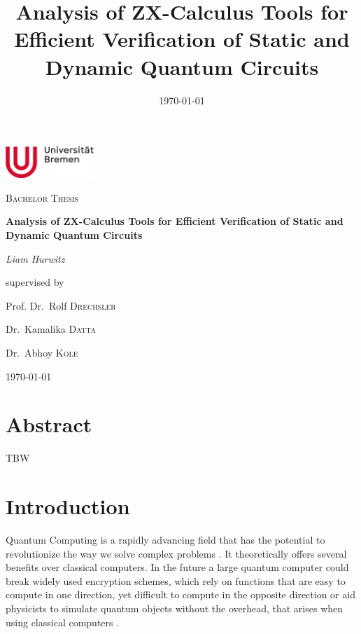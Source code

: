\documentclass[11pt]{article}
\date{\today}
\title{Analysis of ZX-Calculus Tools for Efficient Verification of Static and Dynamic Quantum Circuits}
\theoremstyle{definition}
\theoremstyle{definition}
\begin{document}
\begin{titlepage}
    \centering
    \includegraphics[width=0.25\textwidth]{img/logo_uni_bremen}\par\vspace{1cm}
    {\Large \textsc{Bachelor Thesis}\par}
    \vspace{1.5cm}
    {\huge\bfseries Analysis of ZX-Calculus Tools for Efficient Verification of Static and Dynamic Quantum Circuits\par}
    \vspace{2cm}
    {\Large\itshape Liam Hurwitz\par}
    \vfill
    supervised by\par
  Prof. Dr.~Rolf \textsc{Drechsler}\par
  Dr.~Kamalika \textsc{Datta}\par
  Dr.~Abhoy \textsc{Kole}\par

    \vfill

    {\large \today\par}
\end{titlepage}

\newpage
\tableofcontents \clearpage
{}
\newpage
\addtocounter{page}{0}

\section*{Abstract}
\label{sec:orgf972655}
TBW


\section{Introduction}
\label{sec:orgd11bd8c}
Quantum Computing is a rapidly advancing field that has the potential to
revolutionize the way we solve complex problems \cite{de_potential_2017}.
It theoretically offers several benefits over classical computers.
In the future a large quantum computer could break widely used encryption schemes,
which rely on functions that are easy to compute in one direction, yet
difficult to compute in the opposite direction or aid physicists to simulate
quantum objects without the overhead, that arises when using classical
computers \cite{feynman_simulating_1982}\cite{nielsen_quantum_2010}.
\end{document}

